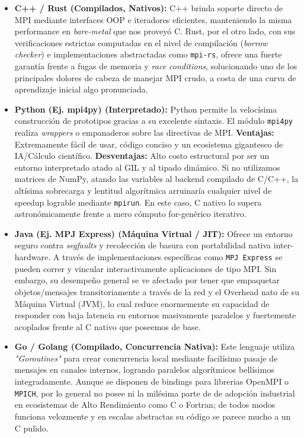\documentclass[11pt,a4paper]{article}
\begin{document}
\begin{itemize}
    \item \textbf{C++ / Rust (Compilados, Nativos):} C++ brinda soporte directo de MPI mediante interfaces OOP e iteradores eficientes, manteniendo la misma performance en \textit{bare-metal} que nos proveyó C. Rust, por el otro lado, con sus verificaciones estrictas computadas en el nivel de compilación (\textit{borrow checker}) e implementaciones abstractadas como \texttt{mpi-rs}, ofrece una fuerte garantía frente a fugas de memoria y \textit{race conditions}, solucionando uno de los principales dolores de cabeza de manejar MPI crudo, a costa de una curva de aprendizaje inicial algo pronunciada.
    \item \textbf{Python (Ej. mpi4py) (Interpretado):} Python permite la velocísima construcción de prototipos gracias a su excelente sintaxis. El módulo \texttt{mpi4py} realiza \textit{wrappers} o empanaderos sobre las directivas de MPI. \textbf{Ventajas:} Extremamente fácil de usar, código conciso y un ecosistema gigantesco de IA/Cálculo científico. \textbf{Desventajas:} Alto costo estructural por ser un entorno interpretado atado al GIL y al tipado dinámico. Si no utilizamos matrices de NumPy, atando las variables al backend compilado de C/C++, la altísima sobrecarga y lentitud algorítmica arruinaría cualquier nivel de speedup lograble mediante \texttt{mpirun}. En este caso, C nativo lo supera astronómicamente frente a mero cómputo for-genérico iterativo.
    \item \textbf{Java (Ej. MPJ Express) (Máquina Virtual / JIT):} Ofrece un entorno seguro contra \textit{segfaults} y recolección de basura con portabilidad nativa inter-hardware. A través de implementaciones específicas como \texttt{MPJ Express} se pueden correr y vincular interactivamente aplicaciones de tipo MPI. Sin embargo, su desempeño general se ve afectado por tener que empaquetar objetos/mensajes transitoriamente a través de la red y el Overhead nato de su Máquina Virtual (JVM), lo cual reduce enormemente su capacidad de responder con baja latencia en entornos masivamente paralelos y fuertemente acoplados frente al C nativo que poseemos de base.
    \item \textbf{Go / Golang (Compilado, Concurrencia Nativa):} Este lenguaje utiliza \textit{"Goroutines"} para crear concurrencia local mediante facilísimo pasaje de mensajes en canales internos, logrando paralelos algorítmicos bellísimos integradamente. Aunque se disponen de bindings para librerias OpenMPI o \texttt{MPICH}, por lo general no posee ni la milésima parte de de adopción industrial en ecosistemas de Alto Rendimiento como C o Fortran; de todos modos funciona velozmente y en escalas abstractas su código se parece mucho a un C pulido.
\end{itemize}
\end{document}
